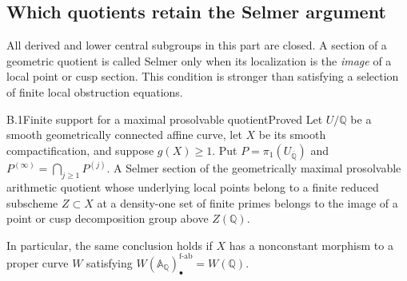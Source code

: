 \subsection{Which quotients retain the Selmer argument}

All derived and lower central subgroups in this part are closed. A section
of a geometric quotient is called Selmer only when its localization is the
\emph{image} of a local point or cusp section. This condition is stronger
than satisfying a selection of finite local obstruction equations.

\begin{statement}{B.1}{Finite support for a maximal prosolvable quotient}{Proved}
Let $U/\mathbb Q$ be a smooth geometrically connected affine curve, let
$X$ be its smooth compactification, and suppose $g(X)\geq1$. Put
$P=\pi_1(U_{\overline{\mathbb Q}})$ and
$P^{(\infty)}=\bigcap_{j\geq1}P^{(j)}$. A Selmer section of the
geometrically maximal prosolvable arithmetic quotient whose underlying
local points belong to a finite reduced subscheme $Z\subset X$ at a
density-one set of finite primes belongs to the image of a point or cusp
decomposition group above $Z(\mathbb Q)$.

In particular, the same conclusion holds if $X$ has a nonconstant
morphism to a proper curve $W$ satisfying
$W(\mathbb A_{\mathbb Q})_\bullet^{\mathrm{f\text{-}ab}}=W(\mathbb Q)$.
\end{statement}
